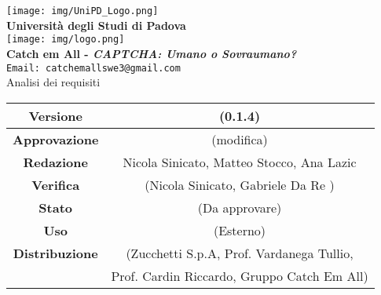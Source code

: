 \thispagestyle{empty}
\begin{titlepage}
\begin{center}
	\texttt{[image: img/UniPD\_Logo.png]}\\
	\bigskip
	\large \textbf{Università degli Studi di Padova}\\
	
	\texttt{[image: img/logo.png]}\\
	\bigskip
	\large \textbf{Catch em All - \textit{CAPTCHA: Umano o Sovraumano?}}\\
	\texttt{Email: catchemallswe3@gmail.com}\\
	\vfill
	{\fontsize{1.5cm}{0}\selectfont Analisi dei requisiti}\\
	\vfill
	\begin{tabularx}{\textwidth}{| c | c |}
		\hline
		\textbf{Versione} & (0.1.4)\\
		\hline
		\textbf{Approvazione} & (modifica)\\
		\hline
		\textbf{Redazione} & Nicola Sinicato, Matteo Stocco, Ana Lazic\\
		\hline
		\textbf{Verifica} & (Nicola Sinicato, Gabriele Da Re )\\
		\hline
		\textbf{Stato} & (Da approvare)\\
		\hline
		\textbf{Uso} & (Esterno)\\
		\hline
		\textbf{Distribuzione} & (Zucchetti S.p.A, Prof. Vardanega Tullio, \\
		&  Prof. Cardin Riccardo, Gruppo Catch Em All)\\
		\hline
	\end{tabularx}
\end{center}
\end{titlepage}

